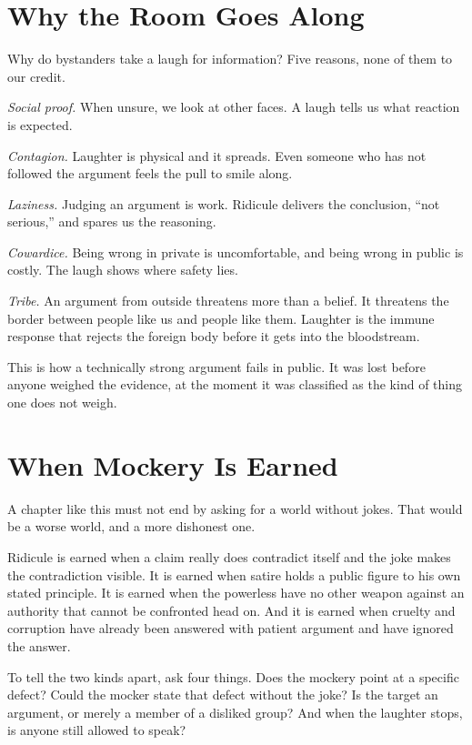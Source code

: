 \documentclass[12pt,a4paper]{book}
\begin{document}
\section{Why the Room Goes Along}

Why do bystanders take a laugh for information? Five reasons, none of them to our credit.

\emph{Social proof.} When unsure, we look at other faces. A laugh tells us what reaction is expected.

\emph{Contagion.} Laughter is physical and it spreads. Even someone who has not followed the argument feels the pull to smile along.

\emph{Laziness.} Judging an argument is work. Ridicule delivers the conclusion, ``not serious,'' and spares us the reasoning.

\emph{Cowardice.} Being wrong in private is uncomfortable, and being wrong in public is costly. The laugh shows where safety lies.

\emph{Tribe.} An argument from outside threatens more than a belief. It threatens the border between people like us and people like them. Laughter is the immune response that rejects the foreign body before it gets into the bloodstream.

This is how a technically strong argument fails in public. It was lost before anyone weighed the evidence, at the moment it was classified as the kind of thing one does not weigh.

\section{When Mockery Is Earned}

A chapter like this must not end by asking for a world without jokes. That would be a worse world, and a more dishonest one.

Ridicule is earned when a claim really does contradict itself and the joke makes the contradiction visible. It is earned when satire holds a public figure to his own stated principle. It is earned when the powerless have no other weapon against an authority that cannot be confronted head on. And it is earned when cruelty and corruption have already been answered with patient argument and have ignored the answer.

To tell the two kinds apart, ask four things. Does the mockery point at a specific defect? Could the mocker state that defect without the joke? Is the target an argument, or merely a member of a disliked group? And when the laughter stops, is anyone still allowed to speak?
\end{document}
